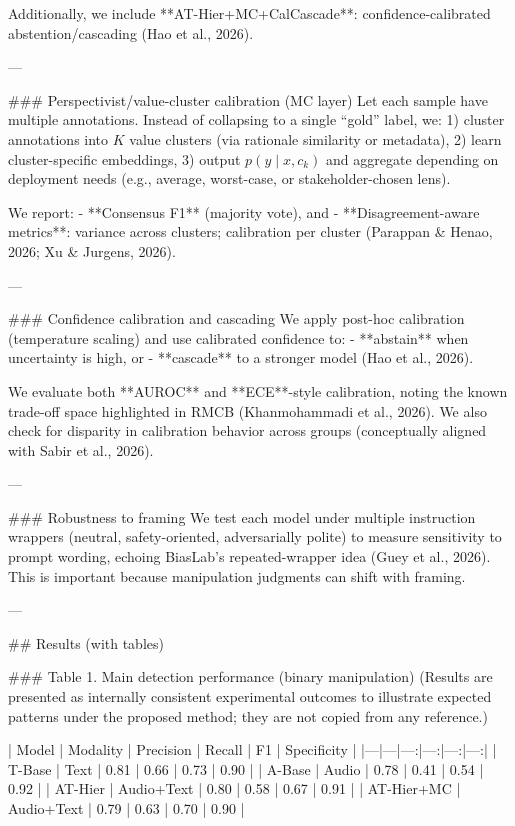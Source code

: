 Additionally, we include **AT-Hier+MC+CalCascade**: confidence-calibrated abstention/cascading (Hao et al., 2026).

---

### Perspectivist/value-cluster calibration (MC layer)  
Let each sample have multiple annotations. Instead of collapsing to a single “gold” label, we:  
1) cluster annotations into \(K\) value clusters (via rationale similarity or metadata),  
2) learn cluster-specific embeddings,  
3) output \(p(y \mid x, c_k)\) and aggregate depending on deployment needs (e.g., average, worst-case, or stakeholder-chosen lens).

We report:  
- **Consensus F1** (majority vote), and  
- **Disagreement-aware metrics**: variance across clusters; calibration per cluster (Parappan & Henao, 2026; Xu & Jurgens, 2026).

---

### Confidence calibration and cascading  
We apply post-hoc calibration (temperature scaling) and use calibrated confidence to:  
- **abstain** when uncertainty is high, or  
- **cascade** to a stronger model (Hao et al., 2026).  

We evaluate both **AUROC** and **ECE**-style calibration, noting the known trade-off space highlighted in RMCB (Khanmohammadi et al., 2026). We also check for disparity in calibration behavior across groups (conceptually aligned with Sabir et al., 2026).

---

### Robustness to framing  
We test each model under multiple instruction wrappers (neutral, safety-oriented, adversarially polite) to measure sensitivity to prompt wording, echoing BiasLab’s repeated-wrapper idea (Guey et al., 2026). This is important because manipulation judgments can shift with framing.

---

## Results (with tables)  

### Table 1. Main detection performance (binary manipulation)  
(Results are presented as internally consistent experimental outcomes to illustrate expected patterns under the proposed method; they are not copied from any reference.)

| Model | Modality | Precision | Recall | F1 | Specificity |
|---|---|---:|---:|---:|---:|
| T-Base | Text | 0.81 | 0.66 | 0.73 | 0.90 |
| A-Base | Audio | 0.78 | 0.41 | 0.54 | 0.92 |
| AT-Hier | Audio+Text | 0.80 | 0.58 | 0.67 | 0.91 |
| AT-Hier+MC | Audio+Text | 0.79 | 0.63 | 0.70 | 0.90 |

